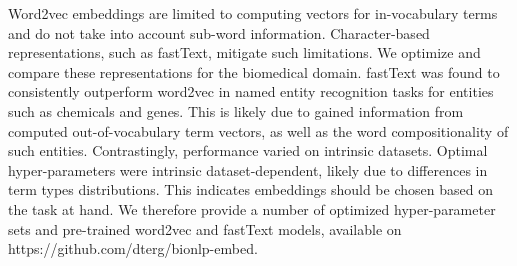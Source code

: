 Word2vec embeddings are limited to computing vectors for in-vocabulary terms and do not take into account sub-word information. Character-based representations, such as fastText, mitigate such limitations. We optimize and compare these representations for the biomedical domain. fastText was found to consistently outperform word2vec in named entity recognition tasks for entities such as chemicals and genes. This is likely due to gained information from computed out-of-vocabulary term vectors, as well as the word compositionality of such entities. Contrastingly, performance varied on intrinsic datasets. Optimal hyper-parameters were intrinsic dataset-dependent, likely due to differences in term types distributions. This indicates embeddings should be chosen based on the task at hand. We therefore provide a number of optimized hyper-parameter sets and pre-trained word2vec and fastText models, available on https://github.com/dterg/bionlp-embed.
